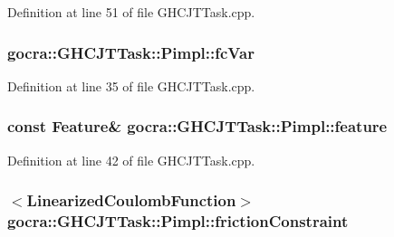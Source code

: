 Definition at line 51 of file G\+H\+C\+J\+T\+Task.\+cpp.

\subsubsection[{\texorpdfstring{fc\+Var}{fcVar}}]{ gocra\+::\+G\+H\+C\+J\+T\+Task\+::\+Pimpl\+::fc\+Var}\hypertarget{structgocra_1_1GHCJTTask_1_1Pimpl_a98ad4a4d2e7bbba67daa244e45f75345}{}\label{structgocra_1_1GHCJTTask_1_1Pimpl_a98ad4a4d2e7bbba67daa244e45f75345}


Definition at line 35 of file G\+H\+C\+J\+T\+Task.\+cpp.

\subsubsection[{\texorpdfstring{feature}{feature}}]{\setlength{\rightskip}{0pt plus 5cm}const {\bf Feature}\& gocra\+::\+G\+H\+C\+J\+T\+Task\+::\+Pimpl\+::feature}\hypertarget{structgocra_1_1GHCJTTask_1_1Pimpl_aa7c75169490e6b35ff7bdb1baf696c5d}{}\label{structgocra_1_1GHCJTTask_1_1Pimpl_aa7c75169490e6b35ff7bdb1baf696c5d}


Definition at line 42 of file G\+H\+C\+J\+T\+Task.\+cpp.

\subsubsection[{\texorpdfstring{friction\+Constraint}{frictionConstraint}}]{$<${\bf Linearized\+Coulomb\+Function}$>$ gocra\+::\+G\+H\+C\+J\+T\+Task\+::\+Pimpl\+::friction\+Constraint}\hypertarget{structgocra_1_1GHCJTTask_1_1Pimpl_a51c9a1862cf46b8ac75a525924d990bb}{}\label{structgocra_1_1GHCJTTask_1_1Pimpl_a51c9a1862cf46b8ac75a525924d990bb}


